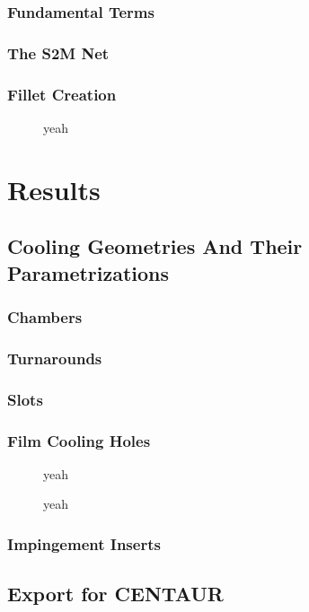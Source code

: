\documentclass[a4paper, 11pt]{report}
\theoremstyle{definition}
\begin{document}
\subsection{Fundamental Terms}
\subsection{The S2M Net}
\subsection{Fillet Creation}
\begin{figure}[!ht]
	\centering
	
	\caption{yeah}
\end{figure}

\chapter{Results}
\section{Cooling Geometries And Their Parametrizations}
\subsection{Chambers}
\subsection{Turnarounds}
\subsection{Slots}
\subsection{Film Cooling Holes}
\begin{figure}[!ht]
	\centering
	
	\caption{yeah}
\end{figure}
\begin{figure}[!ht]
	\centering
	
	\caption{yeah}
\end{figure}


\subsection{Impingement Inserts}
\section{Export for CENTAUR}
\end{document}

